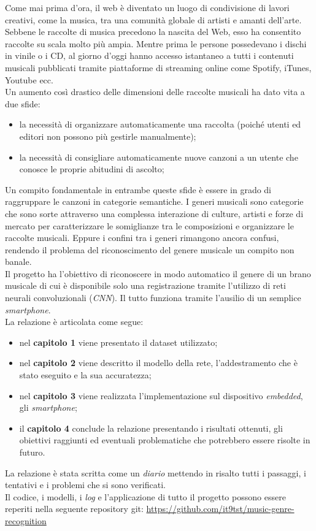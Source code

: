 Come mai prima d'ora, il web è diventato un luogo di condivisione di lavori creativi, come la musica, tra una comunità globale di artisti e amanti dell'arte. Sebbene le raccolte di musica precedono la nascita del Web, esso ha consentito raccolte su scala molto più ampia. Mentre prima le persone possedevano i dischi in vinile o i CD, al giorno d'oggi hanno accesso istantaneo a tutti i contenuti musicali pubblicati tramite piattaforme di streaming online come Spotify, iTunes, Youtube ecc.\\ Un aumento così drastico delle dimensioni delle raccolte musicali ha dato vita a due sfide:
\begin{itemize}
\item la necessità di organizzare automaticamente una raccolta (poiché utenti ed editori non possono più gestirle manualmente);
\item la necessità di consigliare automaticamente nuove canzoni a un utente che conosce le proprie abitudini di ascolto;
\end{itemize}
Un compito fondamentale in entrambe queste sfide è essere in grado di raggruppare le canzoni in categorie semantiche. I generi musicali sono categorie che sono sorte attraverso una complessa interazione di culture, artisti e forze di mercato per caratterizzare le somiglianze tra le composizioni e organizzare le raccolte musicali. Eppure i confini tra i generi rimangono ancora confusi, rendendo il problema del riconoscimento del genere musicale un compito non banale.\\ Il progetto ha l'obiettivo di riconoscere in modo automatico il genere di un brano musicale di cui è disponibile solo una registrazione tramite l'utilizzo di reti neurali convoluzionali (\textit{CNN}). Il tutto funziona tramite l'ausilio di un semplice \textit{smartphone}. \\

La relazione è articolata come segue:
\begin{itemize}
	\item nel \textbf{capitolo 1} viene presentato il dataset utilizzato;
	\item nel \textbf{capitolo 2} viene descritto il modello della rete, l'addestramento che è stato eseguito e la sua accuratezza;
	\item nel \textbf{capitolo 3} viene realizzata l'implementazione sul dispositivo \textit{embedded}, gli \textit{smartphone};
	\item il \textbf{capitolo 4} conclude la relazione presentando i risultati ottenuti, gli obiettivi raggiunti ed eventuali problematiche che potrebbero essere risolte in futuro.
\end{itemize}
La relazione è stata scritta come un \textit{diario} mettendo in risalto tutti i passaggi, i tentativi e i problemi che si sono verificati.\\
\newline
Il codice, i modelli, i \textit{log} e l'applicazione di tutto il progetto possono essere reperiti nella seguente repository git: \href{https://github.com/it9tst/music-genre-recognition}{https://github.com/it9tst/music-genre-recognition}